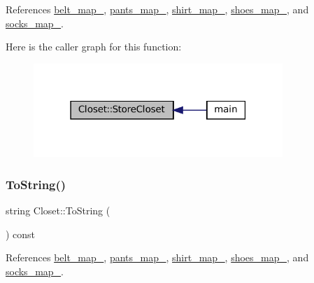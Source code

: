 References \mbox{\hyperlink{classCloset_a0631fe46e3c955109a613e1cd1d2cb52}{belt\+\_\+map\+\_\+}}, \mbox{\hyperlink{classCloset_a8be78859dfab9e2aa09bfbbb8f191dab}{pants\+\_\+map\+\_\+}}, \mbox{\hyperlink{classCloset_a8126a023a2777b84b23436da8d1f4b35}{shirt\+\_\+map\+\_\+}}, \mbox{\hyperlink{classCloset_ab1e1ce9110a044c90244407f0f6f92c4}{shoes\+\_\+map\+\_\+}}, and \mbox{\hyperlink{classCloset_a33a48dfc5ef542261bb0dd373f899f9e}{socks\+\_\+map\+\_\+}}.

Here is the caller graph for this function\+:\nopagebreak
\begin{figure}[H]
\begin{center}
\leavevmode
\includegraphics[width=267pt]{classCloset_a1f2ec8e3e912756e35fdc55c9401ea3e_icgraph}
\end{center}
\end{figure}
\mbox{\label{classCloset_a3bad65dd75ada9a484eb7f78ebfa3b2a}} 
\subsubsection{\texorpdfstring{To\+String()}{ToString()}}
{\footnotesize\ttfamily string Closet\+::\+To\+String (\begin{DoxyParamCaption}{ }\end{DoxyParamCaption}) const}



References \mbox{\hyperlink{classCloset_a0631fe46e3c955109a613e1cd1d2cb52}{belt\+\_\+map\+\_\+}}, \mbox{\hyperlink{classCloset_a8be78859dfab9e2aa09bfbbb8f191dab}{pants\+\_\+map\+\_\+}}, \mbox{\hyperlink{classCloset_a8126a023a2777b84b23436da8d1f4b35}{shirt\+\_\+map\+\_\+}}, \mbox{\hyperlink{classCloset_ab1e1ce9110a044c90244407f0f6f92c4}{shoes\+\_\+map\+\_\+}}, and \mbox{\hyperlink{classCloset_a33a48dfc5ef542261bb0dd373f899f9e}{socks\+\_\+map\+\_\+}}.

